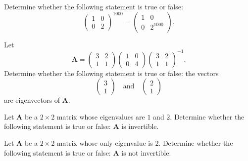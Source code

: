 \begin{problem}
Determine whether the following statement is true or false:
\[
\begin{pmatrix}
1&0\\
0&2
\end{pmatrix}^{1000}
=
\begin{pmatrix}
1&0\\
0&2^{1000}
\end{pmatrix}.
\]
\end{problem}

\begin{problem}
Let
\[
\mathbf A=
\begin{pmatrix}
3&2\\
1&1
\end{pmatrix}
\begin{pmatrix}
1&0\\
0&4
\end{pmatrix}
\begin{pmatrix}
3&2\\
1&1
\end{pmatrix}^{-1}.
\]
Determine whether the following statement is true or false: the vectors
\[
\begin{pmatrix}3\\1\end{pmatrix}
\quad\text{and}\quad
\begin{pmatrix}2\\1\end{pmatrix}
\]
are eigenvectors of $\mathbf A$.
\end{problem}

\begin{problem}
Let $\mathbf A$ be a $2\times2$ matrix whose eigenvalues are $1$ and $2$. Determine whether the following statement is true or false: $\mathbf A$ is invertible.
\end{problem}

\begin{problem}
Let $\mathbf A$ be a $2\times2$ matrix whose only eigenvalue is $2$. Determine whether the following statement is true or false: $\mathbf A$ is not invertible.
\end{problem}

